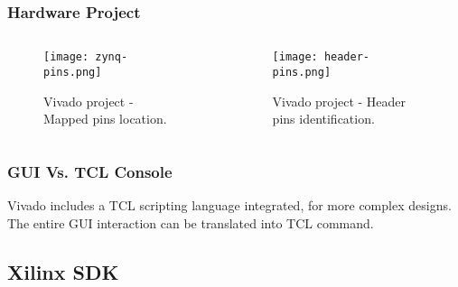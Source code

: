 \begin{frame}
	\frametitle{Hardware Project}
	\begin{columns}
		\begin{column}{0.5\textwidth}
			\begin{figure}
				\texttt{[image: zynq-pins.png]}
				\caption{Vivado project - Mapped pins location.}\label{fig:zynq-pins}
			\end{figure}
		\end{column}
		\begin{column}{0.5\textwidth}
			\begin{figure}
				\texttt{[image: header-pins.png]}
				\caption{Vivado project - Header pins identification.}\label{fig:header-pins}
			\end{figure}
		\end{column}
	\end{columns}
\end{frame}

\begin{frame}[fragile]
	\frametitle{GUI Vs. TCL Console}
	Vivado includes a TCL scripting language integrated, for more complex designs. The entire GUI interaction can be translated into TCL command.
	
\end{frame}

\subsection{Xilinx SDK}

